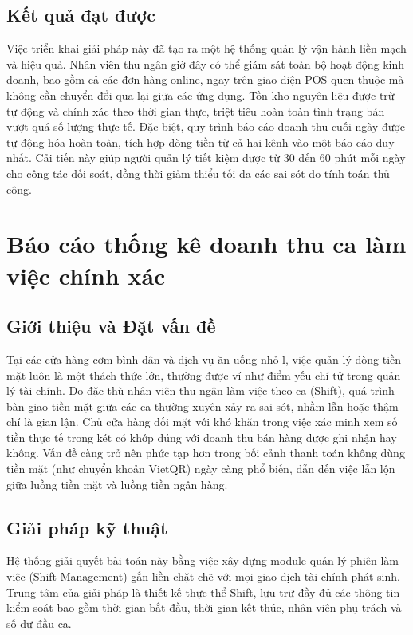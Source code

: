 \documentclass[../20232006p.tex]{subfiles}
\begin{document}
\subsection{Kết quả đạt được}
Việc triển khai giải pháp này đã tạo ra một hệ thống quản lý vận hành liền mạch và hiệu quả. Nhân viên thu ngân giờ đây có thể giám sát toàn bộ hoạt động kinh doanh, bao gồm cả các đơn hàng online, ngay trên giao diện POS quen thuộc mà không cần chuyển đổi qua lại giữa các ứng dụng. Tồn kho nguyên liệu được trừ tự động và chính xác theo thời gian thực, triệt tiêu hoàn toàn tình trạng bán vượt quá số lượng thực tế. Đặc biệt, quy trình báo cáo doanh thu cuối ngày được tự động hóa hoàn toàn, tích hợp dòng tiền từ cả hai kênh vào một báo cáo duy nhất. Cải tiến này giúp người quản lý tiết kiệm được từ 30 đến 60 phút mỗi ngày cho công tác đối soát, đồng thời giảm thiểu tối đa các sai sót do tính toán thủ công.

\section{Báo cáo thống kê doanh thu ca làm việc chính xác}

\subsection{Giới thiệu và Đặt vấn đề}
Tại các cửa hàng cơm bình dân và dịch vụ ăn uống nhỏ l, việc quản lý dòng tiền mặt luôn là một thách thức lớn, thường được ví như điểm yếu chí tử trong quản lý tài chính. Do đặc thù nhân viên thu ngân làm việc theo ca (Shift), quá trình bàn giao tiền mặt giữa các ca thường xuyên xảy ra sai sót, nhầm lẫn hoặc thậm chí là gian lận. Chủ cửa hàng đối mặt với khó khăn trong việc xác minh xem số tiền thực tế trong két có khớp đúng với doanh thu bán hàng được ghi nhận hay không. Vấn đề càng trở nên phức tạp hơn trong bối cảnh thanh toán không dùng tiền mặt (như chuyển khoản VietQR) ngày càng phổ biến, dẫn đến việc lẫn lộn giữa luồng tiền mặt và luồng tiền ngân hàng.

\subsection{Giải pháp kỹ thuật}
Hệ thống giải quyết bài toán này bằng việc xây dựng module quản lý phiên làm việc (Shift Management) gắn liền chặt chẽ với mọi giao dịch tài chính phát sinh. Trung tâm của giải pháp là thiết kế thực thể Shift, lưu trữ đầy đủ các thông tin kiểm soát bao gồm thời gian bắt đầu, thời gian kết thúc, nhân viên phụ trách và số dư đầu ca.
\end{document}
